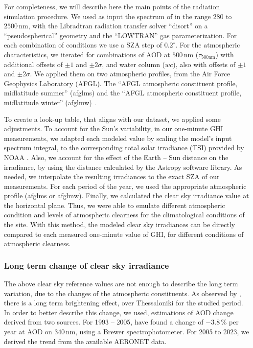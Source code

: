 \documentclass[preprint, 3p,
authoryear]{elsarticle} %
\begin{document}
For completeness, we will describe here the main points of the radiation
simulation procedure. We used as input the spectrum of
\citet{Kurucz1994} in the range \(280\) to \(2500\,\text{nm}\), with the
Libradtran radiation transfer solver ``disort'' on a ``pseudospherical''
geometry and the ``LOWTRAN'' gas parameterization. For each combination
of conditions we use a SZA step of \(0.2^\circ\). For the atmospheric
characteristics, we iterated for combinations of AOD at
\(500\,\text{nm}\) (\(\tau_{500\text{nm}}\)) with additional offsets of
\(\pm1\) and \(\pm2\sigma\), and water column (\(wc\)), also with
offsets of \(\pm1\) and \(\pm2\sigma\). We applied them on two
atmospheric profiles, from the Air Force Geophysics Laboratory (AFGL).
The ``AFGL atmospheric constituent profile, midlatitude summer''
(afglms) and the ``AFGL atmospheric constituent profile, midlatitude
winter'' (afglmw) \citep{Anderson1986}.

To create a look-up table, that aligns with our dataset, we applied some
adjustments. To account for the Sun's variability, in our one-minute GHI
measurements, we adapted each modeled value by scaling the model's input
spectrum integral, to the corresponding total solar irradiance (TSI)
provided by NOAA \citep{Coddington2005}. Also, we account for the effect
of the Earth -- Sun distance on the irradiance, by using the distance
calculated by the Astropy \citep{AstropyCollaboration2022} software
library. As needed, we interpolate the resulting irradiances to the
exact SZA of our measurements. For each period of the year, we used the
appropriate atmospheric profile (afglms or afglmw). Finally, we
calculated the clear sky irradiance value at the horizontal plane. Thus,
we were able to emulate different atmospheric condition and levels of
atmospheric clearness for the climatological conditions of the site.
With this method, the modeled clear sky irradiances can be directly
compared to each measured one-minute value of GHI, for different
conditions of atmospheric clearness.

\hypertarget{long-term-change-of-clear-sky-irradiance}{%
\subsubsection{Long term change of clear sky
irradiance}\label{long-term-change-of-clear-sky-irradiance}}

The above clear sky reference values are not enough to describe the long
term variation, due to the changes of the atmospheric constituents. As
observed by \citet{Natsis2023}, there is a long term brightening effect,
over Thessaloniki for the studied period. In order to better describe
this change, we used, estimations of AOD change derived from two
sources. For 1993 -- 2005, \citet{Kazadzis2007} have found a change of
\(-3.8\,\%\) per year at AOD on \(340\,\text{nm}\), using a Brewer
spectrophotometer. For 2005 to 2023, we derived the trend from the
available AERONET data.
\end{document}

